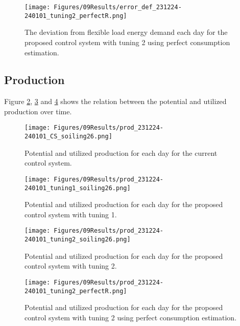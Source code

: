 \begin{figure}[h]
    \centering
    \texttt{[image: Figures/09Results/error\_def\_231224-240101\_tuning2\_perfectR.png]}
    \caption[Flexible load deviation proposed control system 2 perfect R]{The deviation from flexible load energy demand each day for the proposed control system with tuning 2 using perfect consumption estimation. }
    \label{fig:error_def_231224-240101_tuning2_perfectR}
\end{figure}

\subsection{Production}

Figure \ref{fig:prod_231224-240101_CS_soiling26}, \ref{fig:prod_231224-240101_tuning1_soiling26} and \ref{fig:prod_231224-240101_tuning2_soiling26} shows the relation between the potential and utilized production over time. 

\begin{figure}[h]
    \centering
    \texttt{[image: Figures/09Results/prod\_231224-240101\_CS\_soiling26.png]}
    \caption[Potential and utilized production current control system]{Potential and utilized production for each day for the current control system. }
    \label{fig:prod_231224-240101_CS_soiling26}
\end{figure}

\begin{figure}[h]
    \centering
    \texttt{[image: Figures/09Results/prod\_231224-240101\_tuning1\_soiling26.png]}
    \caption[Potential and utilized production proposed control system 1]{Potential and utilized production for each day for the proposed control system with tuning 1. }
    \label{fig:prod_231224-240101_tuning1_soiling26}
\end{figure}

\begin{figure}[h]
    \centering
    \texttt{[image: Figures/09Results/prod\_231224-240101\_tuning2\_soiling26.png]}
    \caption[Potential and utilized production proposed control system 2]{Potential and utilized production for each day for the proposed control system with tuning 2. }
    \label{fig:prod_231224-240101_tuning2_soiling26}
\end{figure}

\begin{figure}[h]
    \centering
    \texttt{[image: Figures/09Results/prod\_231224-240101\_tuning2\_perfectR.png]}
    \caption[Potential and utilized production proposed control system 2 perfect R]{Potential and utilized production for each day for the proposed control system with tuning 2 using perfect consumption estimation. }
    \label{fig:prod_231224-240101_tuning2_perfectR}
\end{figure}


